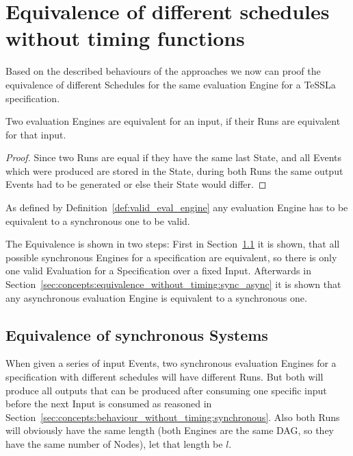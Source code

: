 \section{Equivalence of different schedules without timing functions}
\label{sec:concepts:equivalence_without_timing}

Based on the described behaviours of the approaches we now can proof the equivalence of different Schedules for the same evaluation Engine for a TeSSLa specification.

\begin{lemma}[name = Equivalence of Engines for one Input]\label{lemma:eval_equivalent_if_runs_equal}
  Two evaluation Engines are equivalent for an input, if their Runs are equivalent for that input.
\end{lemma}

\begin{proof}
  Since two Runs are equal if they have the same last State, and all Events which were produced are stored in the State, during both Runs the same output Events had to be generated or else their State would differ.
\end{proof}

As defined by Definition~\ref{def:valid_eval_engine} any evaluation Engine has to be equivalent to a synchronous one to be valid.

The Equivalence is shown in two steps: First in Section~\ref{sec:concepts:equivalence_without_timing:synchronous} it is shown, that all possible synchronous Engines for a specification are equivalent, so there is only one valid Evaluation for a Specification over a fixed Input.
Afterwards in Section~\ref{sec:concepts:equivalence_without_timing:sync_async} it is shown that any asynchronous evaluation Engine is equivalent to a synchronous one.


\subsection{Equivalence of synchronous Systems}
\label{sec:concepts:equivalence_without_timing:synchronous}

When given a series of input Events, two synchronous evaluation Engines for a specification with different schedules will have different Runs.
But both will produce all outputs that can be produced after consuming one specific input before the next Input is consumed as reasoned in Section~\ref{sec:concepts:behaviour_without_timing:synchronous}.
Also both Runs will obviously have the same length (both Engines are the same DAG, so they have the same number of Nodes), let that length be \(l\).

